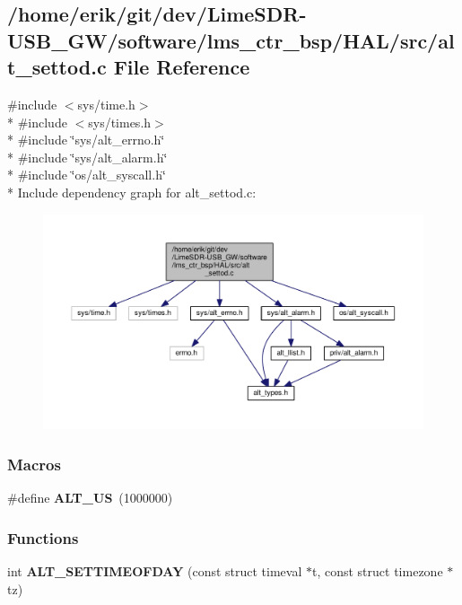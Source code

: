 \subsection{/home/erik/git/dev/\+Lime\+S\+D\+R-\/\+U\+S\+B\+\_\+\+G\+W/software/lms\+\_\+ctr\+\_\+bsp/\+H\+A\+L/src/alt\+\_\+settod.c File Reference}
\label{alt__settod_8c}
{\ttfamily \#include $<$sys/time.\+h$>$}\\*
{\ttfamily \#include $<$sys/times.\+h$>$}\\*
{\ttfamily \#include \char`\"{}sys/alt\+\_\+errno.\+h\char`\"{}}\\*
{\ttfamily \#include \char`\"{}sys/alt\+\_\+alarm.\+h\char`\"{}}\\*
{\ttfamily \#include \char`\"{}os/alt\+\_\+syscall.\+h\char`\"{}}\\*
Include dependency graph for alt\+\_\+settod.\+c\+:
\nopagebreak
\begin{figure}[H]
\begin{center}
\leavevmode
\includegraphics[width=350pt]{d4/d5f/alt__settod_8c__incl}
\end{center}
\end{figure}
\subsubsection*{Macros}
\begin{DoxyCompactItemize}
\item 
\#define {\bf A\+L\+T\+\_\+\+US}~(1000000)
\end{DoxyCompactItemize}
\subsubsection*{Functions}
\begin{DoxyCompactItemize}
\item 
int {\bf A\+L\+T\+\_\+\+S\+E\+T\+T\+I\+M\+E\+O\+F\+D\+AY} (const struct timeval $\ast$t, const struct timezone $\ast$tz)
\end{DoxyCompactItemize}
